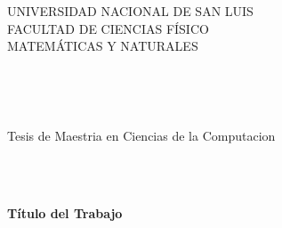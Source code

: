 
\begin{center}

\thispagestyle{empty}



\hspace{-3cm} %







\begin{center}


\end{center}





{\Large UNIVERSIDAD NACIONAL DE SAN LUIS} \\
\vspace{2mm}
{\Large FACULTAD DE CIENCIAS F\'ISICO} \\
\vspace{2mm}
{\Large MATEM\'ATICAS Y NATURALES}

\



\





{\Large {\sc Tesis de Maestria en Ciencias de la Computacion}}\\





\



\





{\Large {\bf T{\'i}tulo del Trabajo}}\\

\vspace{3mm}









\



\



\






\end{center}
